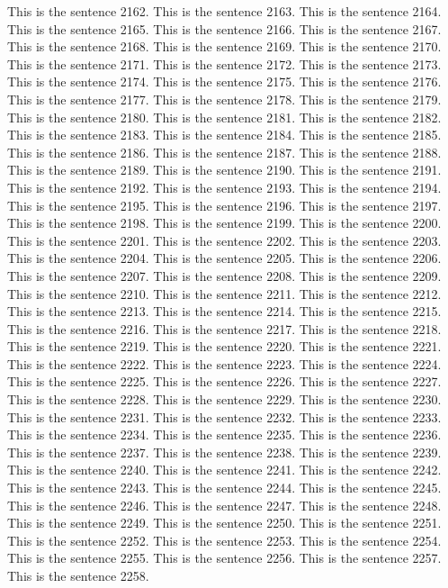 \documentclass{article}
\begin{document}
This is the sentence 2162.
This is the sentence 2163.
This is the sentence 2164.
This is the sentence 2165.
This is the sentence 2166.
This is the sentence 2167.
This is the sentence 2168.
This is the sentence 2169.
This is the sentence 2170.
This is the sentence 2171.
This is the sentence 2172.
This is the sentence 2173.
This is the sentence 2174.
This is the sentence 2175.
This is the sentence 2176.
This is the sentence 2177.
This is the sentence 2178.
This is the sentence 2179.
This is the sentence 2180.
This is the sentence 2181.
This is the sentence 2182.
This is the sentence 2183.
This is the sentence 2184.
This is the sentence 2185.
This is the sentence 2186.
This is the sentence 2187.
This is the sentence 2188.
This is the sentence 2189.
This is the sentence 2190.
This is the sentence 2191.
This is the sentence 2192.
This is the sentence 2193.
This is the sentence 2194.
This is the sentence 2195.
This is the sentence 2196.
This is the sentence 2197.
This is the sentence 2198.
This is the sentence 2199.
This is the sentence 2200.
This is the sentence 2201.
This is the sentence 2202.
This is the sentence 2203.
This is the sentence 2204.
This is the sentence 2205.
This is the sentence 2206.
This is the sentence 2207.
This is the sentence 2208.
This is the sentence 2209.
This is the sentence 2210.
This is the sentence 2211.
This is the sentence 2212.
This is the sentence 2213.
This is the sentence 2214.
This is the sentence 2215.
This is the sentence 2216.
This is the sentence 2217.
This is the sentence 2218.
This is the sentence 2219.
This is the sentence 2220.
This is the sentence 2221.
This is the sentence 2222.
This is the sentence 2223.
This is the sentence 2224.
This is the sentence 2225.
This is the sentence 2226.
This is the sentence 2227.
This is the sentence 2228.
This is the sentence 2229.
This is the sentence 2230.
This is the sentence 2231.
This is the sentence 2232.
This is the sentence 2233.
This is the sentence 2234.
This is the sentence 2235.
This is the sentence 2236.
This is the sentence 2237.
This is the sentence 2238.
This is the sentence 2239.
This is the sentence 2240.
This is the sentence 2241.
This is the sentence 2242.
This is the sentence 2243.
This is the sentence 2244.
This is the sentence 2245.
This is the sentence 2246.
This is the sentence 2247.
This is the sentence 2248.
This is the sentence 2249.
This is the sentence 2250.
This is the sentence 2251.
This is the sentence 2252.
This is the sentence 2253.
This is the sentence 2254.
This is the sentence 2255.
This is the sentence 2256.
This is the sentence 2257.
This is the sentence 2258.
\end{document}
